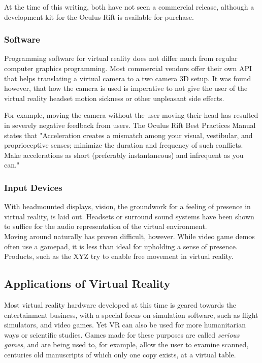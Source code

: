 \documentclass[11pt]{article}
\begin{document}
	
	At the time of this writing, both have not seen a commercial release, although a development kit for the Oculus Rift is available for purchase.

	\subsubsection{Software}
		Programming software for virtual reality does not differ much from regular computer graphics programming. Most commercial vendors offer their own API that helps translating a virtual camera to a two camera 3D setup. It was found however, that how the camera is used is imperative to not give the user of the virtual reality headset motion sickness or other unpleasant side effects. \cite{seppanen14}
		
		
		For example, moving the camera without the user moving their head has resulted in severely negative feedback from users. The Oculus Rift Best Practices Manual states that "Acceleration creates a mismatch among your visual, vestibular, and proprioceptive senses; minimize the duration and frequency of such conflicts. Make accelerations as short (preferably instantaneous) and infrequent as you can." \cite{yao2014oculus}
	
	\subsubsection{Input Devices}
	With headmounted displays, vision, the groundwork for a feeling of presence in virtual reality, is laid out. Headsets or surround sound systems have been shown to suffice for the audio representation of the virtual environment.\\
	Moving around naturally has proven difficult, however. While video game demos often use a gamepad, it is less than ideal for upholding a sense of presence. Products, such as the XYZ try to enable free movement in virtual reality.
	
	\subsection{Applications of Virtual Reality}
	Most virtual reality hardware developed at this time is geared towards the entertainment business, with a special focus on simulation software, such as flight simulators, and video games. %
	Yet VR can also be used for more humanitarian ways or scientific studies. Games made for these purposes are called \emph{serious games}, and are being used to, for example, allow the user to examine scanned, centuries old manuscripts of which only one copy exists, at a virtual table. \cite{lorenzini2013serious}
	
\end{document}
